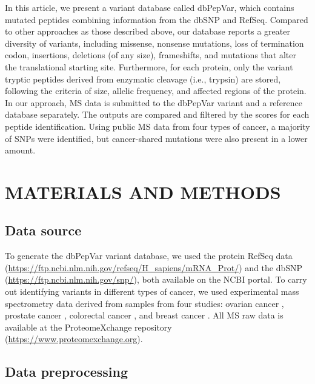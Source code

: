\documentclass{ieeeaccess}
\begin{document}
In this article, we present a variant database called dbPepVar, which contains mutated peptides combining information from the dbSNP and RefSeq. Compared to other approaches as those described above, our database reports a greater diversity of variants, including missense, nonsense mutations, loss of termination codon, insertions, deletions (of any size), frameshifts, and mutations that alter the translational starting site. Furthermore, for each protein, only the variant tryptic peptides derived from enzymatic cleavage (i.e., trypsin) are stored, following the criteria of size, allelic frequency, and affected regions of the protein. In our approach, MS data is submitted to the dbPepVar variant and a reference database separately. The outputs are compared and filtered by the scores for each peptide identification. Using public MS data from four types of cancer, a majority of SNPs were identified, but cancer-shared mutations were also present in a lower amount.

\section{MATERIALS AND METHODS}

\subsection{Data source}

To generate the dbPepVar variant database, we used the protein RefSeq data (\url{https://ftp.ncbi.nlm.nih.gov/refseq/H_sapiens/mRNA_Prot/}) and the dbSNP (\url{https://ftp.ncbi.nlm.nih.gov/snp/}), both available on the NCBI portal. To carry out identifying variants in different types of cancer, we used experimental mass spectrometry data derived from samples from four studies: ovarian cancer \cite{Coscia2016-zq}, prostate cancer \cite{Iglesias-Gato2016-cb}, colorectal cancer \cite{Zhang2014-rb}, and breast cancer \cite{Tyanova2016-sz}. All MS raw data is available at the ProteomeXchange repository (\url{https://www.proteomexchange.org}).

\subsection{Data preprocessing}
\end{document}
